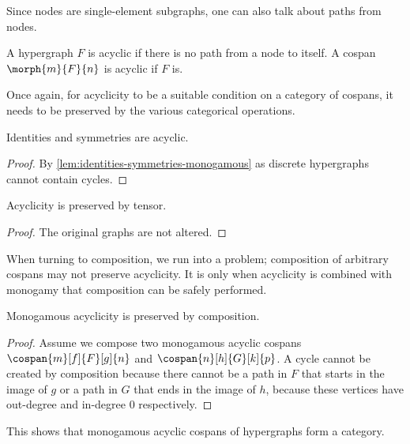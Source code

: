 Since nodes are single-element subgraphs, one can also talk about paths from
nodes.

\begin{definition}
    A hypergraph \(F\) is acyclic if there is no path from a node to itself.
    A cospan \(\morph{m}{F}{n}\) is acyclic if \(F\) is.
\end{definition}

Once again, for acyclicity to be a suitable condition on a category of cospans,
it needs to be preserved by the various categorical operations.

\begin{lemma}\label{lem:identities-symmetries-monogamous-acyclic}
    Identities and symmetries are acyclic.
\end{lemma}
\begin{proof}
    By \cref{lem:identities-symmetries-monogamous} as discrete
    hypergraphs cannot contain cycles.
\end{proof}

\begin{lemma}\label{lem:monogamous-acyclicity-preserved-tensor}
    Acyclicity is preserved by tensor.
\end{lemma}
\begin{proof}
    The original graphs are not altered.
\end{proof}

When turning to composition, we run into a problem; composition of arbitrary
cospans may not preserve acyclicity.
It is only when acyclicity is combined with monogamy that composition can be
safely performed.

\begin{lemma}\label{lem:monogamous-acyclicity-preserved-composition}
    Monogamous acyclicity is preserved by composition.
\end{lemma}
\begin{proof}
    Assume we compose two monogamous acyclic cospans \(
    \cospan{m}[f]{F}[g]{n}
    \) and \(
    \cospan{n}[h]{G}[k]{p}
    \).
    A cycle cannot be created by composition because there cannot be a path in
    \(F\) that starts in the image of \(g\) or a path in \(G\) that ends in the
    image of \(h\), because these vertices have out-degree and in-degree \(0\)
    respectively.
\end{proof}


This shows that monogamous acyclic cospans of hypergraphs form a category.

